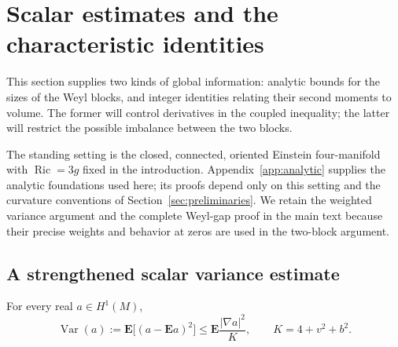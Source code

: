 \section{Scalar estimates and the characteristic identities}
\label{sec:analytic}

This section supplies two kinds of global information: analytic bounds
for the sizes of the Weyl blocks, and integer identities relating their
second moments to volume. The former will control derivatives in the
coupled inequality; the latter will restrict the possible imbalance
between the two blocks.

The standing setting is the closed, connected, oriented Einstein
four-manifold with $\operatorname{Ric}=3g$ fixed in the introduction.
Appendix~\ref{app:analytic} supplies the analytic foundations used here;
its proofs depend only on this setting and the curvature conventions of
Section~\ref{sec:preliminaries}. We retain the weighted variance argument
and the complete Weyl-gap proof in the main text because their precise
weights and behavior at zeros are used in the two-block argument.

\subsection{A strengthened scalar variance estimate}

\begin{proposition}
\label{prop:weighted-variance}
For every real $a\in H^1(M)$,
\begin{equation}
 \operatorname{Var}(a)
 :=\mathbf E\bigl[(a-\mathbf E a)^2\bigr]
 \le\mathbf E\frac{|\nabla a|^2}{K},
 \qquad K=4+v^2+b^2.
 \tag{4}\label{eq:4}
\end{equation}
\end{proposition}


